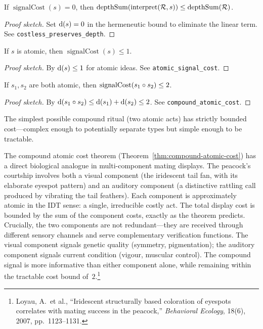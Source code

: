 \begin{theorem}
\label{thm:costless-preserves}
If $\operatorname{signalCost}(s) = 0$, then
$\operatorname{depthSum}(\operatorname{interpret}(\mathcal{R}, s))
 \leq \operatorname{depthSum}(\mathcal{R})$.
\end{theorem}

\begin{proof}[Proof sketch]
Set $\operatorname{d}(s) = 0$ in the hermeneutic bound to eliminate the linear
term.  See \texttt{costless\_preserves\_depth}.
\end{proof}

\begin{theorem}
\label{thm:atomic-cost}
If $s$ is atomic, then $\operatorname{signalCost}(s) \leq 1$.
\end{theorem}

\begin{proof}[Proof sketch]
By $\operatorname{d}(s) \leq 1$ for atomic ideas.
See \texttt{atomic\_signal\_cost}.
\end{proof}

\begin{theorem}
\label{thm:compound-atomic-cost}
If $s_1, s_2$ are both atomic, then
$\operatorname{signalCost}(s_1 \circ s_2) \leq 2$.
\end{theorem}

\begin{proof}[Proof sketch]
By $\operatorname{d}(s_1 \circ s_2) \leq \operatorname{d}(s_1) + \operatorname{d}(s_2) \leq 2$.
See \texttt{compound\_atomic\_cost}.
\end{proof}

\begin{remark}
The simplest possible compound ritual (two atomic acts) has strictly
bounded cost---complex enough to potentially separate types but simple
enough to be tractable.
\end{remark}

\begin{remark}
The compound atomic cost theorem
(Theorem~\ref{thm:compound-atomic-cost}) has a direct biological
analogue in multi-component mating displays.  The peacock's courtship
involves both a visual component (the iridescent tail fan, with its
elaborate eyespot pattern) and an auditory component (a distinctive
rattling call produced by vibrating the tail feathers).  Each component
is approximately atomic in the IDT sense: a single, irreducible costly
act.  The total display cost is bounded by the sum of the component
costs, exactly as the theorem predicts.  Crucially, the two components
are not redundant---they are received through different sensory channels
and serve complementary verification functions.  The visual component
signals genetic quality (symmetry, pigmentation); the auditory component
signals current condition (vigour, muscular control).  The compound
signal is more informative than either component alone, while remaining
within the tractable cost bound of~$2$.\footnote{Loyau, A.\ et al.,
  ``Iridescent structurally based coloration of eyespots correlates
  with mating success in the peacock,'' \textit{Behavioral Ecology},
  18(6), 2007, pp.~1123--1131.}
\end{remark}

